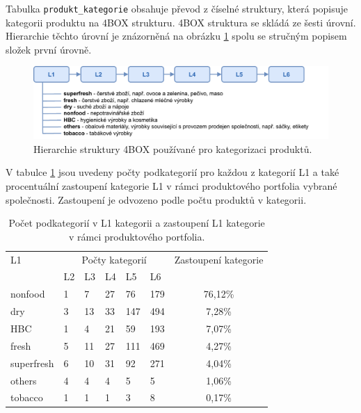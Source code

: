 Tabulka \texttt{produkt\_kategorie} obsahuje převod z číselné struktury, která popisuje kategorii produktu na 4BOX strukturu. 4BOX struktura se skládá ze šesti úrovní. Hierarchie těchto úrovní je znázorněná na obrázku \ref*{obr:d:4box} spolu se stručným popisem složek první úrovně.

\begin{figure}[hbtp!]
    \centering
    \includegraphics[width=\textwidth]{obrazky/4box.pdf}
    \caption{Hierarchie struktury 4BOX používané pro kategorizaci produktů.}
    \label{obr:d:4box}
\end{figure}

V tabulce \ref*{tab:d:4Bzast} jsou uvedeny počty podkategorií pro každou z kategorií L1 a také procentuální zastoupení kategorie L1 v rámci produktového portfolia vybrané společnosti. Zastoupení je odvozeno podle počtu produktů v kategorii.

\begin{table}[hbtp!]
    \captionsetup{justification=centering}
    \begin{center}
    \caption{Počet podkategorií v L1 kategorii a zastoupení L1 kategorie \\ v rámci produktového portfolia.}
    \label{tab:d:4Bzast}
    \begin{tabular}{p{3cm}  p{1cm} p{1cm} p{1cm} p{1cm} p{1cm}  c}
        L1 & \multicolumn{5}{c}{Počty kategorií} &      Zastoupení kategorie                \\
                & L2    & L3   & L4   & L5    & L6    &  \\
        \hline
        nonfood    & 1     & 7    & 27   & 76    & 179   & 76,12\%              \\
        dry         & 3     & 13   & 33   & 147   & 494   & 7,28\%               \\
        HBC        & 1     & 4    & 21   & 59    & 193   & 7,07\%               \\
        fresh       & 5     & 11   & 27   & 111   & 469   & 4,27\%               \\
        superfresh & 6     & 10   & 31   & 92    & 271   & 4,04\%               \\
        others     & 4     & 4    & 4    & 5     & 5     & 1,06\%               \\
        tobacco    & 1     & 1    & 1    & 3     & 8     & 0,17\%            
    \end{tabular}
    \end{center}
    \end{table}

